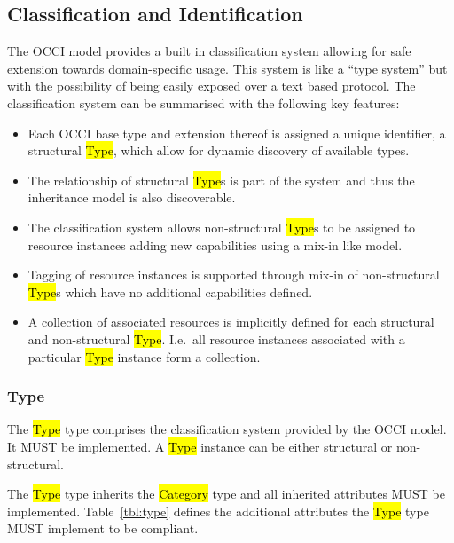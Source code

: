 \documentclass[10pt,a4paper,british]{article}
\begin{document}
\subsection{Classification and Identification}
\label{sec:classification}
The OCCI model provides a built in classification system allowing for safe
extension towards domain-specific usage. This system is like a ``type system''
but with the possibility of being easily exposed over a text based protocol.
%
The classification system can be summarised with the following key features:
\begin{itemize}
\item Each OCCI base type and extension thereof is assigned a unique
 identifier, a structural \hl{Type}, which allow for dynamic discovery of available
 types.
\item The relationship of structural \hl{Type}s is part of the system and thus
 the inheritance model is also discoverable.
\item The classification system allows non-structural \hl{Type}s to be assigned
 to resource instances adding new capabilities using a mix-in like model.
\item Tagging of resource instances is supported through mix-in of
 non-structural \hl{Type}s which have no additional capabilities defined.
\item A collection of associated resources is implicitly defined for each
 structural and non-structural \hl{Type}. I.e.~all resource instances
 associated with a particular \hl{Type} instance form a collection.
\end{itemize}

\subsubsection{Type}
\label{sec:type}
The \hl{Type} type comprises the classification system provided by the OCCI
model. It MUST be implemented. A \hl{Type} instance can be either structural or
non-structural.

The \hl{Type} type inherits the \hl{Category} type and all inherited
attributes MUST be implemented. Table~\ref{tbl:type} defines the
additional attributes the \hl{Type} type MUST implement to be compliant.
\end{document}
